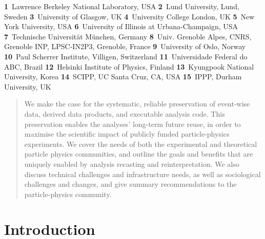 \documentclass[11pt]{article}
\begin{document}
\begin{center}
\textbf{1}~Lawrence Berkeley National Laboratory, USA
\textbf{2}~Lund University, Lund, Sweden
\textbf{3}~University of Glasgow, UK
\textbf{4}~University College London, UK
\textbf{5}~New York University, USA
\textbf{6}~University of Illinois at Urbana-Champaign, USA
\textbf{7}~Technische Universität München, Germany
\textbf{8}~Univ. Grenoble Alpes, CNRS, Grenoble INP, LPSC-IN2P3, Grenoble, France
\textbf{9}~University of Oslo, Norway
\textbf{10}~Paul Scherrer Institute, Villigen, Switzerland
\textbf{11}~Universidade Federal do ABC, Brazil
\textbf{12}~Helsinki Institute of Physics, Finland
\textbf{13}~Kyungpook National University, Korea
\textbf{14}~SCIPP, UC Santa Cruz, CA, USA
\textbf{15}~IPPP, Durham University, UK
\end{center}


\begin{abstract}
\noindent We make the case for the systematic, reliable preservation of event-wise data, derived data products, and executable analysis code. This preservation enables the analyses' long-term future reuse, in order to maximise the scientific impact of publicly funded particle-physics experiments.
We cover the needs of both the experimental and theoretical particle physics communities, and outline the goals and benefits that are uniquely enabled by analysis recasting and reinterpretation. 
We also discuss technical challenges and infrastructure needs, as well as sociological challenges and changes, and give summary recommendations to the particle-physics community.
\end{abstract}

\clearpage%
%
\tableofcontents
\clearpage
\section{Introduction}
\end{document}
